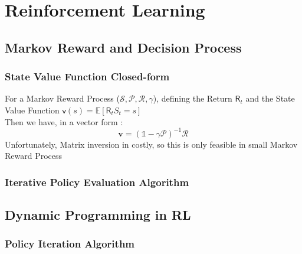 
\chapter{Reinforcement Learning} %
	\label{cha:reinforcement_learning}


\section{Markov Reward and Decision Process} %
	\label{sec:markov_reward_and_decision_process}

	\subsection{State Value Function Closed-form} %
		\label{sub:state_value_function}
		
		For a Markov Reward Process ($\mathcal{S}, \mathcal{P}, \mathcal{R}, \gamma$), defining the Return $\mathsf R_t$ and the State Value Function
		$\mathsf v (s) = \mathbb{E}[\mathsf R_t  S_t = s]$\\
		Then we have, in a vector form : 
		\[
			\mathbf{v} = (\mathbb{1} - \gamma \mathcal P )^{-1} \mathcal{R}
		\]
		Unfortunately, Matrix inversion in costly, so this is only feasible in small Markov Reward Process

	\subsection{Iterative Policy Evaluation Algorithm} %
		\label{sub:iterative_policy_evaluation_algorithm}


\section{Dynamic Programming in RL} %
	\label{sec:dynamic_programming_in_rl}

	\subsection{Policy Iteration Algorithm} %
		\label{sub:policy_iteration_algorithm}
		

